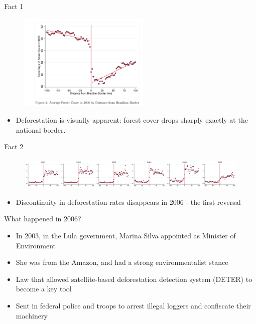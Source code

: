 \documentclass[11pt,notes=hide,aspectratio=169,mathserif]{beamer}
\begin{document}
\begin{frame}{Fact 1}
\begin{figure}
\centering
\includegraphics[width=0.56\textwidth]{../TA9/inputs/fig2.3.png}
\end{figure}
\begin{itemize}
\item Deforestation is visually apparent: forest cover drops sharply exactly at the national border.
\end{itemize}
\end{frame}


\begin{frame}{Fact 2}
\begin{figure}
\centering
\includegraphics[width=1\textwidth]{../TA9/inputs/fig_2006.png}
\end{figure}
\begin{itemize}
\item Discontinuity in deforestation rates disappears in 2006 - the first reversal 
\end{itemize}
\end{frame}

\begin{frame}{What happened in 2006?}
\begin{itemize}
\item In 2003, in the Lula government, Marina Silva appointed as Minister of Environment
\item She was from the Amazon, and had a strong environmentalist stance
\item Law that allowed satellite-based deforestation detection system (DETER) to become a key tool
\item Sent in federal police and troops to arrest illegal loggers and confiscate their machinery
\end{itemize}
\end{frame}
\end{document}
